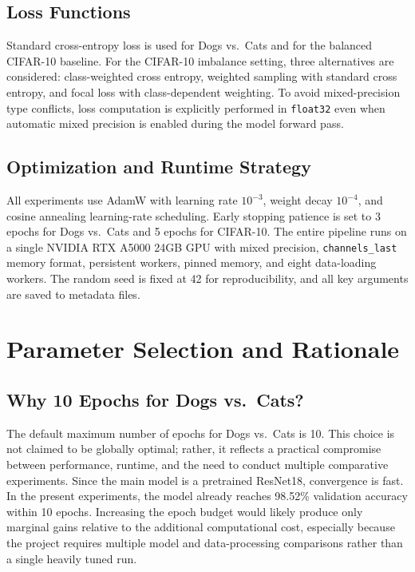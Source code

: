 \documentclass[11pt,a4paper]{article}
\begin{document}
\subsection{Loss Functions}
Standard cross-entropy loss is used for Dogs vs.\ Cats and for the balanced CIFAR-10 baseline. For the CIFAR-10 imbalance setting, three alternatives are considered: class-weighted cross entropy, weighted sampling with standard cross entropy, and focal loss with class-dependent weighting. To avoid mixed-precision type conflicts, loss computation is explicitly performed in \texttt{float32} even when automatic mixed precision is enabled during the model forward pass.

\subsection{Optimization and Runtime Strategy}
All experiments use AdamW with learning rate $10^{-3}$, weight decay $10^{-4}$, and cosine annealing learning-rate scheduling. Early stopping patience is set to 3 epochs for Dogs vs.\ Cats and 5 epochs for CIFAR-10. The entire pipeline runs on a single NVIDIA RTX A5000 24GB GPU with mixed precision, \texttt{channels\_last} memory format, persistent workers, pinned memory, and eight data-loading workers. The random seed is fixed at 42 for reproducibility, and all key arguments are saved to metadata files.

\section{Parameter Selection and Rationale}

\subsection{Why 10 Epochs for Dogs vs.\ Cats?}
The default maximum number of epochs for Dogs vs.\ Cats is 10. This choice is not claimed to be globally optimal; rather, it reflects a practical compromise between performance, runtime, and the need to conduct multiple comparative experiments. Since the main model is a pretrained ResNet18, convergence is fast. In the present experiments, the model already reaches 98.52\% validation accuracy within 10 epochs. Increasing the epoch budget would likely produce only marginal gains relative to the additional computational cost, especially because the project requires multiple model and data-processing comparisons rather than a single heavily tuned run.
\end{document}
